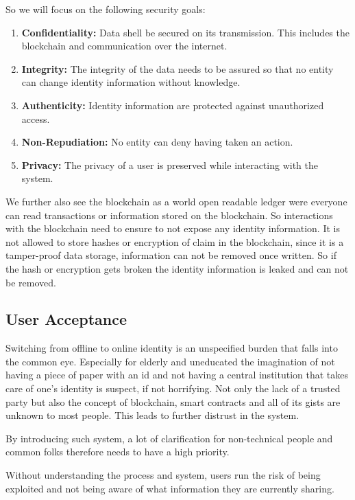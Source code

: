 So we will focus on the following security goals:
\begin{enumerate}
\item \textbf{Confidentiality:} Data shell be secured on its transmission. This includes the blockchain and communication over the internet. 
\item \textbf{Integrity:} The integrity of the data needs to be assured so that no entity can change identity information without knowledge. 
\item \textbf{Authenticity:} Identity information are protected against unauthorized access. 
\item \textbf{Non-Repudiation:} No entity can deny having taken an action.
\item \textbf{Privacy:} The privacy of a user is preserved while interacting with the system. 
\end{enumerate}

We further also see the blockchain as a world open readable ledger were everyone can read transactions or information stored on the blockchain. So interactions with the blockchain need to ensure to not expose any identity information. 
It is not allowed to store hashes or encryption of claim in the blockchain, since it is a tamper-proof data storage, information can not be removed once written. So if the hash or encryption gets broken the identity information is leaked and can not be removed.  

\subsection{User Acceptance}
\label{sec:userAcceptance}

Switching from offline to online identity is an unspecified burden that falls into the common eye.
Especially for elderly and uneducated the imagination of not having a piece of paper with an id and not having a central
institution that takes care of one's identity is suspect, if not horrifying.
Not only the lack of a trusted party but also the concept of blockchain, smart contracts and all of its gists are unknown
to most people. This leads to further distrust in the system.

By introducing such system, a lot of clarification for non-technical people and common folks therefore needs to have a
high priority.

Without understanding the process and system, users run the risk of being exploited and not being aware of what information
they are currently sharing.


